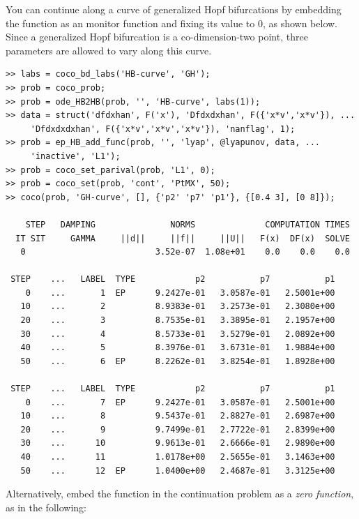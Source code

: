 You can continue along a curve of generalized Hopf bifurcations by embedding the  function as an  monitor function and fixing its value to $0$, as shown below. Since a generalized Hopf bifurcation is a co-dimension-two point, three parameters are allowed to vary along this curve.
\begin{lstlisting}[language=coco-highlight,frame=lines]
>> labs = coco_bd_labs('HB-curve', 'GH');
>> prob = coco_prob;
>> prob = ode_HB2HB(prob, '', 'HB-curve', labs(1));
>> data = struct('dfdxhan', F('x'), 'Dfdxdxhan', F({'x*v','x*v'}), ...
     'Dfdxdxdxhan', F({'x*v','x*v','x*v'}), 'nanflag', 1);
>> prob = ep_HB_add_func(prob, '', 'lyap', @lyapunov, data, ...
     'inactive', 'L1');
>> prob = coco_set_parival(prob, 'L1', 0);
>> prob = coco_set(prob, 'cont', 'PtMX', 50);
>> coco(prob, 'GH-curve', [], {'p2' 'p7' 'p1'}, {[0.4 3], [0 8]});

    STEP   DAMPING               NORMS              COMPUTATION TIMES
  IT SIT     GAMMA     ||d||     ||f||     ||U||   F(x)  DF(x)  SOLVE
   0                          3.52e-07  1.08e+01    0.0    0.0    0.0

 STEP    ...   LABEL  TYPE            p2           p7           p1
    0    ...       1  EP      9.2427e-01   3.0587e-01   2.5001e+00
   10    ...       2          8.9383e-01   3.2573e-01   2.3080e+00
   20    ...       3          8.7535e-01   3.3895e-01   2.1957e+00
   30    ...       4          8.5733e-01   3.5279e-01   2.0892e+00
   40    ...       5          8.3976e-01   3.6731e-01   1.9884e+00
   50    ...       6  EP      8.2262e-01   3.8254e-01   1.8928e+00

 STEP    ...   LABEL  TYPE            p2           p7           p1
    0    ...       7  EP      9.2427e-01   3.0587e-01   2.5001e+00
   10    ...       8          9.5437e-01   2.8827e-01   2.6987e+00
   20    ...       9          9.7499e-01   2.7722e-01   2.8399e+00
   30    ...      10          9.9613e-01   2.6666e-01   2.9890e+00
   40    ...      11          1.0178e+00   2.5655e-01   3.1463e+00
   50    ...      12  EP      1.0400e+00   2.4687e-01   3.3125e+00
\end{lstlisting}
Alternatively, embed the  function in the continuation problem as a \textit{zero function}, as in the following:
